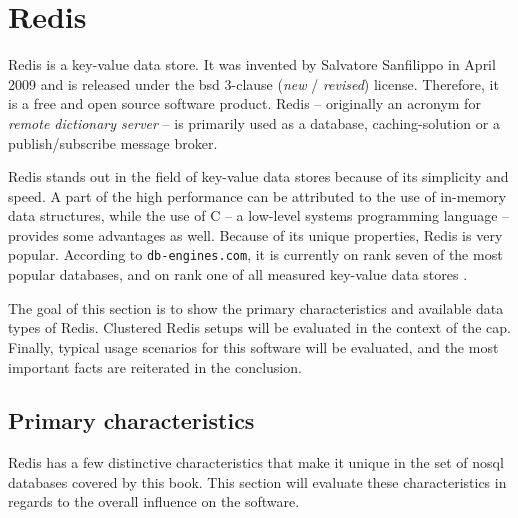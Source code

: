 \section{Redis}

Redis is a key-value data store. It was invented by Salvatore Sanfilippo in
April 2009 and is released under the \gls{bsd} 3-clause (\textit{new} /
\textit{revised}) license. Therefore, it is a free and open source software
product. Redis -- originally an acronym for \textit{remote dictionary server} --
is primarily used as a database, caching-solution or a publish/subscribe message
broker.

Redis stands out in the field of key-value data stores because of its simplicity
and speed. A part of the high performance can be attributed to the use of
in-memory data structures, while the use of C -- a low-level systems programming
language -- provides some advantages as well. Because of its unique properties,
Redis is very popular. According to \texttt{db-engines.com}, it is currently on
rank seven of the most popular databases, and on rank one of all measured
key-value data stores \parencite{dbenginesRanking}.

The goal of this section is to show the primary characteristics and available
data types of Redis. Clustered Redis setups will be evaluated in the context of
the \gls{cap}. Finally, typical usage scenarios for this software will be
evaluated, and the most important facts are reiterated in the conclusion.

\subsection{Primary characteristics}
Redis has a few distinctive characteristics that make it unique in the set of
\gls{nosql} databases covered by this book. This section will evaluate these
characteristics in regards to the overall influence on the software.

